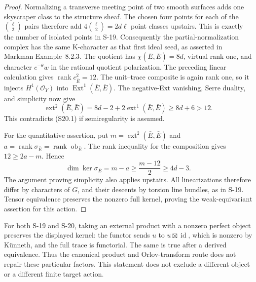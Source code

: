\begin{proof}
Normalizing a transverse meeting point of two smooth
surfaces adds one skyscraper class to the structure sheaf.
The chosen four points for each of the $\binom\ell2$ pairs
therefore add $4\binom\ell2=2d\ell$ point classes upstairs.
This is exactly the number of isolated points in S-19.
Consequently the partial-normalization complex has the same
K-character as that first ideal seed, as asserted in
Markman Example~8.2.3. The quotient has
$\chi(\bar E,\bar E)=8d$, virtual rank one, and character
$e^{-\theta}w$ in the rational quotient polarization.
The preceding linear calculation gives
$\operatorname{rank}c_{\bar E}^2=12$.
The unit--trace composite is again rank one, so it injects
$H^1(\mathcal O_Y)$ into
$\operatorname{Ext}^1(\bar E,\bar E)$.
The negative-Ext vanishing, Serre duality, and simplicity
now give
\[
 \operatorname{ext}^2(\bar E,\bar E)
 =8d-2+2\operatorname{ext}^1(\bar E,\bar E)
 \ge8d+6>12.
\]
This contradicts (S20.1) if semiregularity is assumed.

For the quantitative assertion, put
$m=\operatorname{ext}^2(\bar E,\bar E)$ and
$a=\operatorname{rank}\sigma_{\bar E}
=\operatorname{rank}\operatorname{ob}_{\bar E}$.
The rank inequality for the composition gives
$12\ge2a-m$. Hence
\[
 \dim\ker\sigma_{\bar E}=m-a
 \ge\frac{m-12}{2}\ge4d-3.
\]
The argument proving simplicity also applies upstairs.
All linearizations therefore differ by characters of $G$,
and their descents by torsion line bundles, as in S-19.
Tensor equivalence preserves the nonzero full kernel,
proving the weak-equivariant assertion for this action.
\end{proof}

For both S-19 and S-20, taking an external product with a
nonzero perfect object preserves the displayed kernel:
the functor sends $u$ to $u\boxtimes\operatorname{id}$,
which is nonzero by K\"unneth, and the full trace is functorial.
The same is true after a derived equivalence.
Thus the canonical product and Orlov-transform route does not
repair these particular factors. This statement does not
exclude a different object or a different finite target action.

